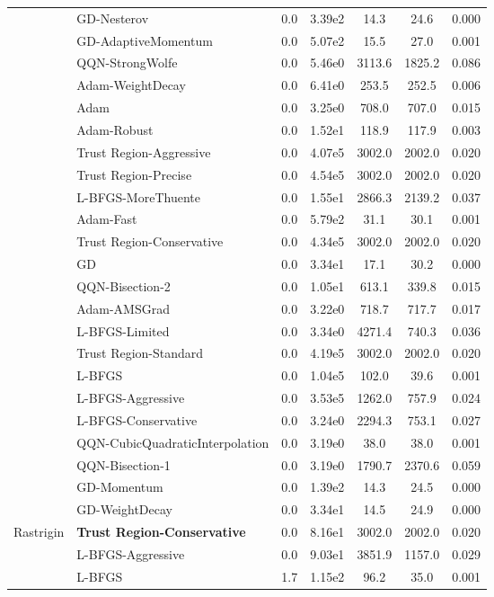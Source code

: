 \documentclass{article}
\begin{document}
\begin{table}[htbp]
{\begin{tabular}{p{2.5cm}p{2.5cm}*{5}{c}}
 & GD-Nesterov & 0.0 & 3.39e2 & 14.3 & 24.6 & 0.000 \\
 & GD-AdaptiveMomentum & 0.0 & 5.07e2 & 15.5 & 27.0 & 0.001 \\
 & QQN-StrongWolfe & 0.0 & 5.46e0 & 3113.6 & 1825.2 & 0.086 \\
 & Adam-WeightDecay & 0.0 & 6.41e0 & 253.5 & 252.5 & 0.006 \\
 & Adam & 0.0 & 3.25e0 & 708.0 & 707.0 & 0.015 \\
 & Adam-Robust & 0.0 & 1.52e1 & 118.9 & 117.9 & 0.003 \\
 & Trust Region-Aggressive & 0.0 & 4.07e5 & 3002.0 & 2002.0 & 0.020 \\
 & Trust Region-Precise & 0.0 & 4.54e5 & 3002.0 & 2002.0 & 0.020 \\
 & L-BFGS-MoreThuente & 0.0 & 1.55e1 & 2866.3 & 2139.2 & 0.037 \\
 & Adam-Fast & 0.0 & 5.79e2 & 31.1 & 30.1 & 0.001 \\
 & Trust Region-Conservative & 0.0 & 4.34e5 & 3002.0 & 2002.0 & 0.020 \\
 & GD & 0.0 & 3.34e1 & 17.1 & 30.2 & 0.000 \\
 & QQN-Bisection-2 & 0.0 & 1.05e1 & 613.1 & 339.8 & 0.015 \\
 & Adam-AMSGrad & 0.0 & 3.22e0 & 718.7 & 717.7 & 0.017 \\
 & L-BFGS-Limited & 0.0 & 3.34e0 & 4271.4 & 740.3 & 0.036 \\
 & Trust Region-Standard & 0.0 & 4.19e5 & 3002.0 & 2002.0 & 0.020 \\
 & L-BFGS & 0.0 & 1.04e5 & 102.0 & 39.6 & 0.001 \\
 & L-BFGS-Aggressive & 0.0 & 3.53e5 & 1262.0 & 757.9 & 0.024 \\
 & L-BFGS-Conservative & 0.0 & 3.24e0 & 2294.3 & 753.1 & 0.027 \\
 & QQN-CubicQuadraticInterpolation & 0.0 & 3.19e0 & 38.0 & 38.0 & 0.001 \\
 & QQN-Bisection-1 & 0.0 & 3.19e0 & 1790.7 & 2370.6 & 0.059 \\
 & GD-Momentum & 0.0 & 1.39e2 & 14.3 & 24.5 & 0.000 \\
 & GD-WeightDecay & 0.0 & 3.34e1 & 14.5 & 24.9 & 0.000 \\
\midrule
\multirow{25}{*}{Rastrigin} & \textbf{Trust Region-Conservative} & 0.0 & 8.16e1 & 3002.0 & 2002.0 & 0.020 \\
 & L-BFGS-Aggressive & 0.0 & 9.03e1 & 3851.9 & 1157.0 & 0.029 \\
 & L-BFGS & 1.7 & 1.15e2 & 96.2 & 35.0 & 0.001 \\

\end{tabular}}
\end{table}
\end{document}
